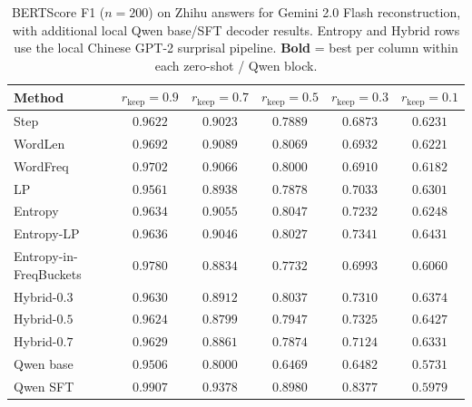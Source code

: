 \documentclass[11pt]{article}
\newcommand{\rkeep}{r_{\mathrm{keep}}}
\begin{document}
\begin{table}[tbp]
\centering
\small
\caption{BERTScore F1 ($n=200$) on Zhihu
answers for Gemini 2.0 Flash reconstruction, with additional local Qwen
base/SFT decoder results.  Entropy and Hybrid rows
use the local Chinese GPT-2 surprisal pipeline. \textbf{Bold} = best per column within each zero-shot / Qwen block.}
\label{tab:zhihu_bertscore}
\begin{tabular}{lccccc}
\toprule
\textbf{Method} & $\rkeep{=}0.9$ & $\rkeep{=}0.7$ & $\rkeep{=}0.5$ & $\rkeep{=}0.3$ & $\rkeep{=}0.1$ \\
\midrule
Step          & $0.9622$ & $0.9023$ & $0.7889$ & $0.6873$ & $0.6231$ \\
WordLen   & $0.9692$ & $\mathbf{0.9089}$ & $\mathbf{0.8069}$ & $0.6932$ & $0.6221$ \\
WordFreq& $0.9702$ & $0.9066$ & $0.8000$ & $0.6910$ & $0.6182$ \\
LP  & $0.9561$ & $0.8938$ & $0.7878$ & $0.7033$ & $0.6301$ \\
Entropy                 & $0.9634$ & $0.9055$ & $0.8047$ & $0.7232$ & $0.6248$ \\
Entropy-LP              & $0.9636$ & $0.9046$ & $0.8027$ & $\mathbf{0.7341}$ & $\mathbf{0.6431}$ \\
Entropy-in-FreqBuckets  & $\mathbf{0.9780}$ & $0.8834$ & $0.7732$ & $0.6993$ & $0.6060$ \\
Hybrid-$0.3$            & $0.9630$ & $0.8912$ & $0.8037$ & $0.7310$ & $0.6374$ \\
Hybrid-$0.5$            & $0.9624$ & $0.8799$ & $0.7947$ & $0.7325$ & $0.6427$ \\
Hybrid-$0.7$            & $0.9629$ & $0.8861$ & $0.7874$ & $0.7124$ & $0.6331$ \\
\midrule
Qwen base              & $0.9506$ & $0.8000$ & $0.6469$ & $0.6482$ & $0.5731$ \\
Qwen SFT               & $\mathbf{0.9907}$ & $\mathbf{0.9378}$ & $\mathbf{0.8980}$ & $\mathbf{0.8377}$ & $\mathbf{0.5979}$ \\
\bottomrule
\end{tabular}
\end{table}
\end{document}
